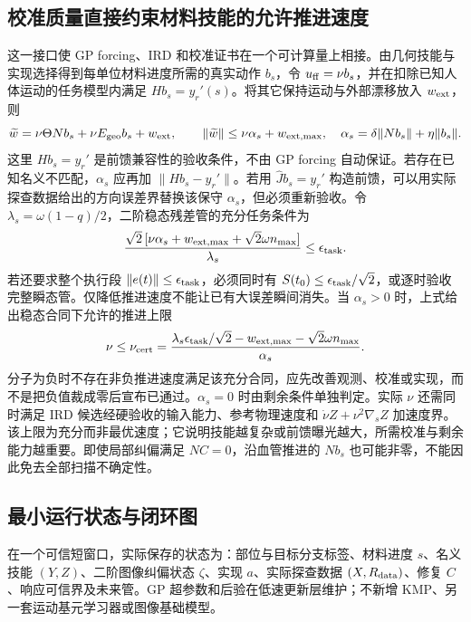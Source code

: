 \documentclass[11pt,a4paper]{article}
\numberwithin{equation}{section}
\theoremstyle{definition}
\begin{document}
\subsection{校准质量直接约束材料技能的允许推进速度}
这一接口使 GP forcing、IRD 和校准证书在一个可计算量上相接。由几何技能与实现选择得到每单位材料进度所需的真实动作 $b_s$，令 $u_{\rm ff}=\nu b_s$，并在扣除已知人体运动的任务模型内满足 $Hb_s=y_r'(s)$。将其它保持运动与外部漂移放入 $w_{\rm ext}$，则
\begin{equation}
 \widetilde w=\nu\Theta Nb_s+\nu E_{\rm geo}b_s+w_{\rm ext},\qquad
 \|\widetilde w\|\le\nu\alpha_s+w_{{\rm ext},\max},\quad
 \alpha_s=\delta\|Nb_s\|+\eta\|b_s\|.
\end{equation}
这里 $Hb_s=y_r'$ 是前馈兼容性的验收条件，不由 GP forcing 自动保证。若存在已知名义不匹配，$\alpha_s$ 应再加 $\|Hb_s-y_r'\|$。若用 $\widehat Jb_s=y_r'$ 构造前馈，可以用实际探查数据给出的方向误差界替换该保守 $\alpha_s$，但必须重新验收。令 $\lambda_s=\omega(1-q)/2$，二阶稳态残差管的充分任务条件为
\begin{equation}
 \frac{\sqrt2\,[\nu\alpha_s+w_{{\rm ext},\max}+\sqrt2\omega n_{\max}]}{\lambda_s}
 \le\epsilon_{\rm task}.
\label{eq:v43:progress-contract}
\end{equation}
若还要求整个执行段 $\|e(t)\|\le\epsilon_{\rm task}$，必须同时有 $S(t_0)\le\epsilon_{\rm task}/\sqrt2$，或逐时验收完整瞬态管。仅降低推进速度不能让已有大误差瞬间消失。当 $\alpha_s>0$ 时，上式给出稳态合同下允许的推进上限
\begin{equation}
 \nu\le\nu_{\rm cert}=
 \frac{\lambda_s\epsilon_{\rm task}/\sqrt2-w_{{\rm ext},\max}-\sqrt2\omega n_{\max}}{\alpha_s}.
\end{equation}
分子为负时不存在非负推进速度满足该充分合同，应先改善观测、校准或实现，而不是把负值裁成零后宣布已通过。$\alpha_s=0$ 时由剩余条件单独判定。实际 $\nu$ 还需同时满足 IRD 候选经硬验收的输入能力、参考物理速度和 $\dot\nu Z+\nu^2\nabla_s Z$ 加速度界。该上限为充分而非最优速度；它说明技能越复杂或前馈曝光越大，所需校准与剩余能力越重要。即使局部纠偏满足 $NC=0$，沿血管推进的 $Nb_s$ 也可能非零，不能因此免去全部扫描不确定性。

\subsection{最小运行状态与闭环图}
在一个可信短窗口，实际保存的状态为：部位与目标分支标签、材料进度 $s$、名义技能 $(Y,Z)$、二阶图像纠偏状态 $\zeta$、实现 $a$、实际探查数据 $(X,R_{\rm data})$、修复 $C$、响应可信界及未来管。GP 超参数和后验在低速更新层维护；不新增 KMP、另一套运动基元学习器或图像基础模型。
\end{document}
